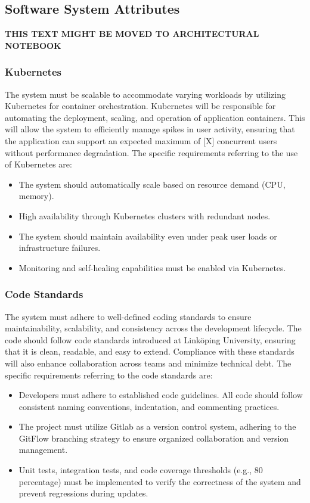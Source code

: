 \documentclass{article}
\begin{document}
\subsection{Software System Attributes}

\textbf{THIS TEXT MIGHT BE MOVED TO ARCHITECTURAL NOTEBOOK}

\subsubsection{Kubernetes}
The system must be scalable to accommodate varying workloads by utilizing Kubernetes for container orchestration. Kubernetes will be responsible for automating the deployment, scaling, and operation of application containers. This will allow the system to efficiently manage spikes in user activity, ensuring that the application can support an expected maximum of [X] concurrent users without performance degradation. The specific requirements referring to the use of Kubernetes are:
\begin{itemize}
    \item 
The system should automatically scale based on resource demand (CPU, memory).
    \item 
High availability through Kubernetes clusters with redundant nodes.
    \item 
The system should maintain availability even under peak user loads or infrastructure failures.
    \item 
Monitoring and self-healing capabilities must be enabled via Kubernetes.
\end{itemize}

\subsubsection{Code Standards}
The system must adhere to well-defined coding standards to ensure maintainability, scalability, and consistency across the development lifecycle. The code should follow code standards introduced at Linköping University, ensuring that it is clean, readable, and easy to extend. Compliance with these standards will also enhance collaboration across teams and minimize technical debt. The specific requirements referring to the code standards are:

\begin{itemize}
    \item 
Developers must adhere to established code guidelines. All code should follow consistent naming conventions, indentation, and commenting practices.
    \item 
The project must utilize Gitlab as a version control system, adhering to the GitFlow branching strategy to ensure organized collaboration and version management.
    \item 
Unit tests, integration tests, and code coverage thresholds (e.g., 80 percentage) must be implemented to verify the correctness of the system and prevent regressions during updates.
\end{itemize}
\end{document}
